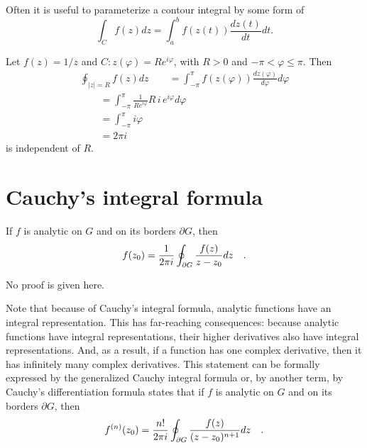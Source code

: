 Often it is useful to parameterize a contour integral by some form of
 \begin{equation}
\int_{C}f(z)dz= \int_{a}^b f(z(t))\frac{dz(t)}{dt} dt.
\end{equation}


{
\color{blue}
\bexample
Let $f(z) = 1/z$ and $C: z(\varphi )=R e^{i\varphi}$, with $R>0$ and $-\pi < \varphi \le \pi$. Then
\begin{equation}
\begin{split}
\oint_{\vert z\vert =R}
f (z) dz
\qquad =
\int_{-\pi}^\pi
f (z(\varphi ))\frac{dz(\varphi )}{d\varphi } d\varphi   \\
\qquad =
\int_{-\pi}^\pi
\frac{1}{R e^{i\varphi}}R \, i\, e^{i\varphi} d\varphi   \\
\qquad =
\int_{-\pi}^\pi
i\varphi   \\
\qquad =    2\pi i
\end{split}
\end{equation}
is independent of $R$.
\eexample
}



 \section{Cauchy's integral formula}

If $f$ is analytic on $G$ and on its borders $\partial G$, then
\begin{equation}
f(z_0)={1\over 2\pi i}\oint_{\partial G}{f(z)\over z-z_0}dz\quad
 .
\label{2012-m-ch-ca-cif}
\end{equation}

No proof is given here.

Note that because of Cauchy's integral formula, analytic
functions have an integral representation.
This  has far-reaching consequences:
because analytic functions have integral
representations, their higher derivatives also have integral representations.
And, as a result,
if a function has one complex derivative, then it has infinitely many complex derivatives.
This statement can be formally expressed by
the generalized Cauchy  integral formula or, by another term,
by Cauchy's differentiation formula
states that if $f$ is analytic on $G$ and on its borders $\partial G$, then
\begin{equation}
f^{(n)}(z_0)={n!\over 2\pi i}\oint_{\partial G}{f(z)\over
 (z-z_0)^{n+1}}dz\quad
\label{2012-m-ch-cagcif}
 .\end{equation}

